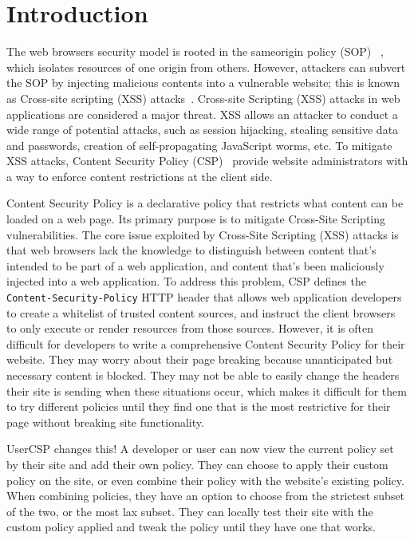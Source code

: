 \section{Introduction}
\label{sec:background}

The web browsers security model is rooted in the sameorigin policy
(SOP) ~\cite{sop}, which isolates resources of one origin from
others. However, attackers can subvert the SOP by injecting malicious
contents into a vulnerable website; this is known as Cross-site
scripting (XSS) attacks~\cite{xss}. Cross-site Scripting (XSS) attacks
in web applications are considered a major threat. XSS allows an
attacker to conduct a wide range of potential attacks, such as session
hijacking, stealing sensitive data and passwords, creation of
self-propagating JavaScript worms, etc. To mitigate XSS attacks,
Content Security Policy (CSP)~\cite{csp} provide website
administrators with a way to enforce content restrictions at the
client side.

Content Security Policy is a declarative policy that restricts what
content can be loaded on a web page. Its primary purpose is to
mitigate Cross-Site Scripting vulnerabilities.  The core issue
exploited by Cross-Site Scripting (XSS) attacks is that web browsers
lack the knowledge to distinguish between content that's intended to
be part of a web application, and content that's been maliciously
injected into a web application. To address this problem, CSP defines
the {\tt Content-Security-Policy} HTTP header that allows web application
developers to create a whitelist of trusted content sources, and
instruct the client browsers to only execute or render resources from
those sources. However, it is often difficult for developers to write
a comprehensive Content Security Policy for their website. They may
worry about their page breaking because unanticipated but necessary
content is blocked. They may not be able to easily change the headers
their site is sending when these situations occur, which makes it
difficult for them to try different policies until they find one that
is the most restrictive for their page without breaking site
functionality.

UserCSP changes this! A developer or user can now view the current
policy set by their site and add their own policy.  They can choose to
apply their custom policy on the site, or even combine their policy
with the website’s existing policy.  When combining policies, they
have an option to choose from the strictest subset of the two, or the
most lax subset.  They can locally test their site with the custom
policy applied and tweak the policy until they have one that works.

